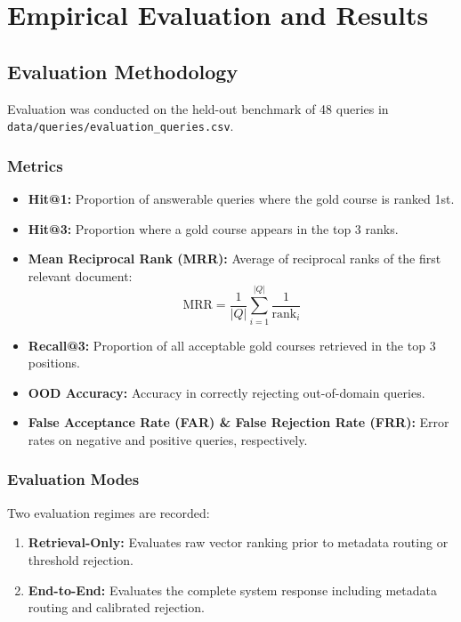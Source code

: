 \documentclass[12pt,a4paper]{report}
\begin{document}
\chapter{Empirical Evaluation and Results}

\section{Evaluation Methodology}
Evaluation was conducted on the held-out benchmark of 48 queries in \texttt{data/queries/evaluation\_queries.csv}. 

\subsection{Metrics}
\begin{itemize}
    \item \textbf{Hit@1:} Proportion of answerable queries where the gold course is ranked 1st.
    \item \textbf{Hit@3:} Proportion where a gold course appears in the top 3 ranks.
    \item \textbf{Mean Reciprocal Rank (MRR):} Average of reciprocal ranks of the first relevant document:
    \begin{equation}
        \text{MRR} = \frac{1}{|Q|} \sum_{i=1}^{|Q|} \frac{1}{\text{rank}_i}
    \end{equation}
    \item \textbf{Recall@3:} Proportion of all acceptable gold courses retrieved in the top 3 positions.
    \item \textbf{OOD Accuracy:} Accuracy in correctly rejecting out-of-domain queries.
    \item \textbf{False Acceptance Rate (FAR) \& False Rejection Rate (FRR):} Error rates on negative and positive queries, respectively.
\end{itemize}

\subsection{Evaluation Modes}
Two evaluation regimes are recorded:
\begin{enumerate}
    \item \textbf{Retrieval-Only:} Evaluates raw vector ranking prior to metadata routing or threshold rejection.
    \item \textbf{End-to-End:} Evaluates the complete system response including metadata routing and calibrated rejection.
\end{enumerate}
\end{document}
